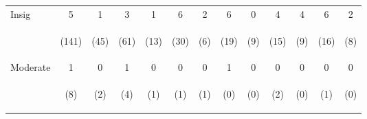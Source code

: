 \begin{tabular}{lcccccccccccc}
\hline \noalign{\smallskip}Insig & 5 & 1 & 3 & 1 & 6 & 2 & 6 & 0 & 4 & 4 & 6 & 2\\
 & \begin{footnotesize}(141)\end{footnotesize} & \begin{footnotesize}(45)\end{footnotesize} & \begin{footnotesize}(61)\end{footnotesize} & \begin{footnotesize}(13)\end{footnotesize} & \begin{footnotesize}(30)\end{footnotesize} & \begin{footnotesize}(6)\end{footnotesize} & \begin{footnotesize}(19)\end{footnotesize} & \begin{footnotesize}(9)\end{footnotesize} & \begin{footnotesize}(15)\end{footnotesize} & \begin{footnotesize}(9)\end{footnotesize} & \begin{footnotesize}(16)\end{footnotesize} & \begin{footnotesize}(8)\end{footnotesize}\\
\noalign{\smallskip}Moderate & 1 & 0 & 1 & 0 & 0 & 0 & 1 & 0 & 0 & 0 & 0 & 0\\
 & \begin{footnotesize}(8)\end{footnotesize} & \begin{footnotesize}(2)\end{footnotesize} & \begin{footnotesize}(4)\end{footnotesize} & \begin{footnotesize}(1)\end{footnotesize} & \begin{footnotesize}(1)\end{footnotesize} & \begin{footnotesize}(1)\end{footnotesize} & \begin{footnotesize}(0)\end{footnotesize} & \begin{footnotesize}(0)\end{footnotesize} & \begin{footnotesize}(2)\end{footnotesize} & \begin{footnotesize}(0)\end{footnotesize} & \begin{footnotesize}(1)\end{footnotesize} & \begin{footnotesize}(0)\end{footnotesize}\\

\end{tabular}
